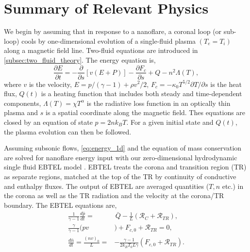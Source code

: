 \documentclass[apj]{emulateapj}
\begin{document}
	\section{Summary of Relevant Physics}
	\label{sec:phys_sum}
	\par We begin by assuming that in response to a nanoflare, a coronal loop (or sub-loop) cools by one-dimensional evolution of a single-fluid plasma $(T_e = T_i)$ along a magnetic field line. Two-fluid equations are introduced in \autoref{subsec:two_fluid_theory}. The energy equation is,
	\begin{equation}
		\label{eq:energy_1d}
		\frac{\partial E}{\partial t} = -\frac{\partial}{\partial s}[v(E+P)] - \frac{\partial F_c}{\partial s} + Q - n^2\Lambda(T),
	\end{equation}
where $v$ is the velocity, $E=p/(\gamma -1) + \rho v^2/2$, $F_c=-\kappa_0 T^{5/2}\partial T/\partial s$ is the heat flux, $Q(t)$ is a heating function that includes both steady and time-dependent components, $\Lambda(T)=\chi T^{\alpha}$ is the radiative loss function in an optically thin plasma \citep[e.g.][]{klimchuk_highly_2008} and $s$ is a spatial coordinate along the magnetic field. Thes equations are closed by an equation of state $p=2nk_BT$. For a given initial state and $Q(t)$, the plasma evolution can then be followed. 
	\par Assuming subsonic flows, \autoref{eq:energy_1d} and the equation of mass conservation are solved for nanoflare energy input with our zero-dimensional hydrodynamic single fluid EBTEL model \citep[see][for derivations]{klimchuk_highly_2008,cargill_enthalpy-based_2012,cargill_enthalpy-based_2012-1,cargill_modelling_2015}. EBTEL treats the corona and transition region (TR) as separate regions, matched at the top of the TR by continuity of conductive and enthalpy fluxes. The output of EBTEL are averaged quantities ($T,n$ etc.) in the corona as well as the TR radiation and the velocity at the corona/TR boundary. The EBTEL equations are,
	\begin{align}
		\frac{1}{\gamma - 1}\frac{d\bar{p}}{dt} =& \,\bar{Q} - \frac{1}{L}(\mathcal{R}_C + \mathcal{R}_{TR}), \label{eq:energy_0d} \\
		\frac{\gamma}{\gamma - 1}(pv&) + F_{c,0} + \mathcal{R}_{TR} = 0, \label{eq:tr_energy_0d} \\
		\frac{d\bar{n}}{dt} = \frac{(nv)_0}{L} =& -\frac{\gamma - 1}{2k_BT_0L\gamma}(F_{c,0} + \mathcal{R}_{TR}).\label{eq:mass_0d}
	\end{align}
\end{document}
